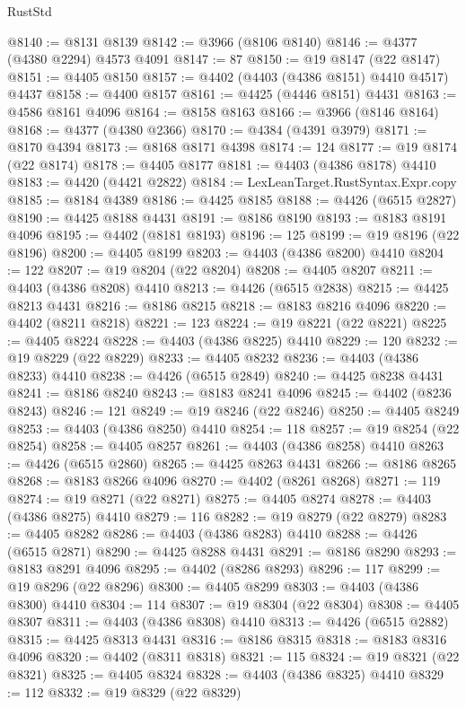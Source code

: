 \begin{lexlean}{RustStd}
\begin{coremodule}
@8140 := @8131 @8139
@8142 := @3966 (@8106 @8140)
@8146 := @4377 (@4380 @2294) @4573 @4091
@8147 := 87
@8150 := @19 @8147 (@22 @8147)
@8151 := @4405 @8150
@8157 := @4402 (@4403 (@4386 @8151) @4410 @4517) @4437
@8158 := @4400 @8157
@8161 := @4425 (@4446 @8151) @4431
@8163 := @4586 @8161 @4096
@8164 := @8158 @8163
@8166 := @3966 (@8146 @8164)
@8168 := @4377 (@4380 @2366)
@8170 := @4384 (@4391 @3979)
@8171 := @8170 @4394
@8173 := @8168 @8171 @4398
@8174 := 124
@8177 := @19 @8174 (@22 @8174)
@8178 := @4405 @8177
@8181 := @4403 (@4386 @8178) @4410
@8183 := @4420 (@4421 @2822)
@8184 := LexLeanTarget.RustSyntax.Expr.copy
@8185 := @8184 @4389
@8186 := @4425 @8185
@8188 := @4426 (@6515 @2827)
@8190 := @4425 @8188 @4431
@8191 := @8186 @8190
@8193 := @8183 @8191 @4096
@8195 := @4402 (@8181 @8193)
@8196 := 125
@8199 := @19 @8196 (@22 @8196)
@8200 := @4405 @8199
@8203 := @4403 (@4386 @8200) @4410
@8204 := 122
@8207 := @19 @8204 (@22 @8204)
@8208 := @4405 @8207
@8211 := @4403 (@4386 @8208) @4410
@8213 := @4426 (@6515 @2838)
@8215 := @4425 @8213 @4431
@8216 := @8186 @8215
@8218 := @8183 @8216 @4096
@8220 := @4402 (@8211 @8218)
@8221 := 123
@8224 := @19 @8221 (@22 @8221)
@8225 := @4405 @8224
@8228 := @4403 (@4386 @8225) @4410
@8229 := 120
@8232 := @19 @8229 (@22 @8229)
@8233 := @4405 @8232
@8236 := @4403 (@4386 @8233) @4410
@8238 := @4426 (@6515 @2849)
@8240 := @4425 @8238 @4431
@8241 := @8186 @8240
@8243 := @8183 @8241 @4096
@8245 := @4402 (@8236 @8243)
@8246 := 121
@8249 := @19 @8246 (@22 @8246)
@8250 := @4405 @8249
@8253 := @4403 (@4386 @8250) @4410
@8254 := 118
@8257 := @19 @8254 (@22 @8254)
@8258 := @4405 @8257
@8261 := @4403 (@4386 @8258) @4410
@8263 := @4426 (@6515 @2860)
@8265 := @4425 @8263 @4431
@8266 := @8186 @8265
@8268 := @8183 @8266 @4096
@8270 := @4402 (@8261 @8268)
@8271 := 119
@8274 := @19 @8271 (@22 @8271)
@8275 := @4405 @8274
@8278 := @4403 (@4386 @8275) @4410
@8279 := 116
@8282 := @19 @8279 (@22 @8279)
@8283 := @4405 @8282
@8286 := @4403 (@4386 @8283) @4410
@8288 := @4426 (@6515 @2871)
@8290 := @4425 @8288 @4431
@8291 := @8186 @8290
@8293 := @8183 @8291 @4096
@8295 := @4402 (@8286 @8293)
@8296 := 117
@8299 := @19 @8296 (@22 @8296)
@8300 := @4405 @8299
@8303 := @4403 (@4386 @8300) @4410
@8304 := 114
@8307 := @19 @8304 (@22 @8304)
@8308 := @4405 @8307
@8311 := @4403 (@4386 @8308) @4410
@8313 := @4426 (@6515 @2882)
@8315 := @4425 @8313 @4431
@8316 := @8186 @8315
@8318 := @8183 @8316 @4096
@8320 := @4402 (@8311 @8318)
@8321 := 115
@8324 := @19 @8321 (@22 @8321)
@8325 := @4405 @8324
@8328 := @4403 (@4386 @8325) @4410
@8329 := 112
@8332 := @19 @8329 (@22 @8329)

\end{coremodule}
\end{lexlean}

